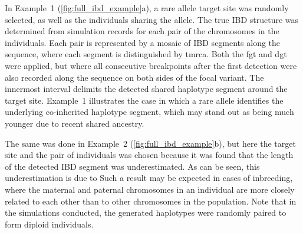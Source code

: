 In Example~1 (\ref{fig:full_ibd_example}{a}), a rare allele target site was randomly selected, as well as the  individuals sharing the  allele.
The true IBD structure was determined from simulation records for each pair of the  chromosomes in the  individuals.
Each pair is represented by a mosaic of IBD segments along the sequence, where each segment is distinguished by \gls{tmrca}.
Both the \gls{fgt} and \gls{dgt} were applied, but where all consecutive breakpoints after the first detection were also recorded along the sequence on both sides of the focal variant.
The innermost interval delimits the detected shared haplotype segment around the target site.
Example~1 illustrates the case in which a rare allele identifies the underlying co-inherited haplotype segment, which may stand out as being much younger due to recent shared ancestry.

%

%

The same was done in Example~2 (\ref{fig:full_ibd_example}{b}), but here the target site and the pair of individuals was chosen because it was found that the length of the detected IBD segment was underestimated.
As can be seen, this underestimation is due to 
Such a result may be expected in cases of inbreeding, where the maternal and paternal chromosomes in an individual are more closely related to each other than to other chromosomes in the population.
Note that in the simulations conducted, the generated haplotypes were randomly paired to form diploid individuals.




